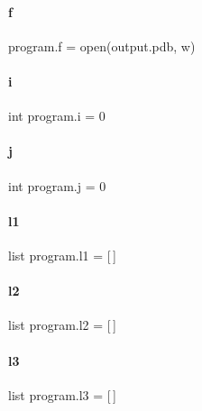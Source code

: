 \mbox{\label{namespaceprogram_af3cf1336dd6b364a2186dd146e846a4a}} 
\paragraph{f}
{\footnotesize\ttfamily program.\+f = open(\textquotesingle{}output.\+pdb\textquotesingle{}, \textquotesingle{}w\textquotesingle{})}

\mbox{\label{namespaceprogram_ac317d4ad54c6a8161f773f78ed3706df}} 
\paragraph{i}
{\footnotesize\ttfamily int program.\+i = 0}

\mbox{\label{namespaceprogram_a92d03558a515800f73c19c8710295cc5}} 
\paragraph{j}
{\footnotesize\ttfamily int program.\+j = 0}

\mbox{\label{namespaceprogram_a6a6cf9e68362df4d3f9221f3bbaff328}} 
\paragraph{l1}
{\footnotesize\ttfamily list program.\+l1 = [$\,$]}

\mbox{\label{namespaceprogram_a631ead734881d95594ef2e6b731147d8}} 
\paragraph{l2}
{\footnotesize\ttfamily list program.\+l2 = [$\,$]}

\mbox{\label{namespaceprogram_aa5ad09e37935612153cdb18c5391925d}} 
\paragraph{l3}
{\footnotesize\ttfamily list program.\+l3 = [$\,$]}

\mbox{\label{namespaceprogram_af0a43a99aad1062c2c602205ab8fd5a7}} 
